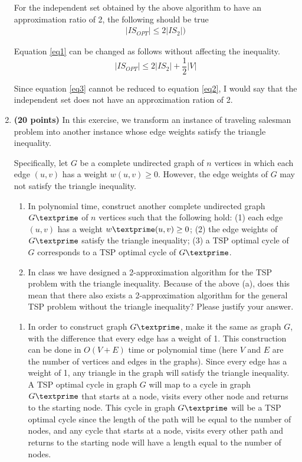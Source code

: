 \documentclass[paper=a4, fontsize=11pt]{scrartcl} %
\numberwithin{figure}{section} %
\numberwithin{table}{section} %
\begin{document}
\begin{enumerate}
For the independent set obtained by the above algorithm to have an approximation ratio of 2, the following should be true
\begin{align}
\label{eq2} 
\left | IS_{OPT} \right | \leq 2 \left | IS_2 \right |)
\end{align}

Equation \ref{eq1} can be changed as follows without affecting the inequality.
\begin{equation} 
\label{eq3}
\left | IS_{OPT} \right | \leq 2 \left | IS_2 \right | + \frac{1}{2} \left | V \right |
\end{equation}

Since equation \ref{eq3} cannot be reduced to equation \ref{eq2}, I would say that the independent set does not have an approximation ration of 2.

\item \textbf{(20 points)} In this exercise, we transform an instance of traveling salesman problem into another instance whose edge weights satisfy the triangle inequality.

Specifically, let $G$ be a complete undirected graph of $n$ vertices in which each edge $(u, v)$ has a weight $w(u, v) \geq 0$. However, the edge weights of $G$ may not satisfy the triangle inequality.

\begin{enumerate}
\item In polynomial time, construct another complete undirected graph $G\textprime$ of $n$ vertices such that the following hold: (1) each edge $(u,v)$ has a weight $w\textprime(u,v) \geq 0$; (2) the edge weights of $G\textprime$ satisfy the triangle inequality; (3) a TSP optimal cycle of $G$ corresponds to a TSP optimal cycle of $G\textprime$.

\item In class we have designed a 2-approximation algorithm for the TSP problem with the triangle inequality. Because of the above (a), does this mean that there also exists a 2-approximation algorithm for the general TSP problem without the triangle inequality? Please justify your answer.\\
\end{enumerate}

\begin{enumerate}
\item In order to construct graph $G\textprime$, make it the same as graph $G$, with the difference that every edge has a weight of 1. This construction can be done in $O(V+E)$ time or polynomial time (here $V$ and $E$ are the number of vertices and edges in the graphs). Since every edge has a weight of 1, any triangle in the graph will satisfy the triangle inequality. A TSP optimal cycle in graph $G$ will map to a cycle in graph $G\textprime$ that starts at a node, visits every other node and returns to the starting node. This cycle in graph $G\textprime$ will be a TSP optimal cycle since the length of the path will be equal to the number of nodes, and any cycle that starts at a node, visits every other path and returns to the starting node will have a length equal to the number of nodes.


\end{enumerate}
\end{enumerate}
\end{document}
